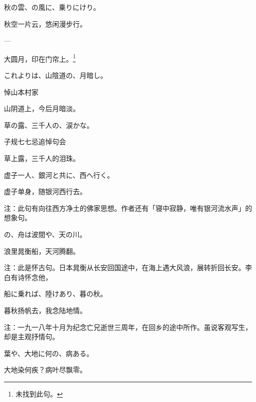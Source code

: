 \begin{haiku}
    {\FH 秋の雲、の風に、乗りにけり。}

    {\FK 秋空一片云，悠闲漫步行。}
\end{haiku}

\begin{haiku}
    {\FH ---}

    {\FK 大圆月，印在门帘上。\footnote{\FT 未找到此句。}}
\end{haiku}

\begin{haiku}
    {\FH これよりは、山陰道の、月暗し。}

    {\FK 悼山本村家}

    {\FK 山阴道上，今后月暗淡。}
\end{haiku}

\begin{haiku}
    {\FH 草の露、三千人の、涙かな。}

    {\FK 子规七七忌追悼句会}

    {\FK 草上露，三千人的泪珠。}
\end{haiku}

\begin{haiku}
    {\FH 虚子一人、銀河と共に、西へ行く。}

    {\FK 虚子单身，随银河西行去。}

    {\FT 注：此句有向往西方净土的佛家思想。作者还有「寝中寂静，唯有银河流水声」的想象句。}
\end{haiku}

\begin{haiku}
    {\FH {}の、舟は波間や、天の川。}

    {\FK 浪里晁衡船，天河腾翻。}

    {\FT 注：此是怀古句。日本晁衡从长安回国途中，在海上遇大风浪，展转折回长安。李白有诗怀念他，}
\end{haiku}

\begin{haiku}
    {\FH 船に乗れば、陸けあり、暮の秋。}

    {\FK 暮秋扬帆去，我念陆地情。}

    {\FT 注：一九一八年十月为纪念亡兄逝世三周年，在回乡的途中所作。虽说客观写生，却是主观抒情句。}
\end{haiku}

\begin{haiku}
    {\FH {}葉や、大地に何の、病ある。}

    {\FK 大地染何疾？病叶尽飘零。}
\end{haiku}

